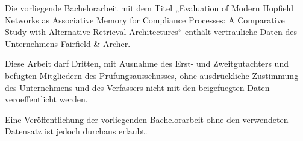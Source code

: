 
Die vorliegende Bachelorarbeit mit dem Titel „Evaluation of Modern Hopfield Networks as Associative Memory for Compliance Processes: A Comparative Study with Alternative Retrieval Architectures“ enthält vertrauliche Daten des Unternehmens Fairfield \& Archer.

Diese Arbeit darf Dritten, mit Ausnahme des Erst- und Zweitgutachters und befugten Mitgliedern des Prüfungsausschusses, ohne ausdrückliche Zustimmung des Unternehmens und des Verfassers nicht mit den beigefuegten Daten veroeffentlicht werden.

Eine Veröffentlichung der vorliegenden Bachelorarbeit ohne den verwendeten Datensatz ist jedoch durchaus erlaubt.